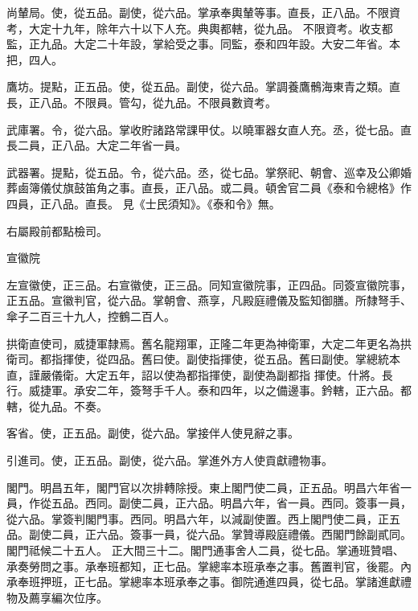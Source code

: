 \begin{pinyinscope}
 尚輦局。使，從五品。副使，從六品。掌承奉輿輦等事。直長，正八品。不限資考，大定十九年，除年六十以下人充。典輿都轄，從九品。
 不限資考。收支都監，正九品。大定二十年設，掌給受之事。同監，泰和四年設。大安二年省。本把，四人。



 鷹坊。提點，正五品。使，從五品。副使，從六品。掌調養鷹鶻海東青之類。直長，正八品。不限員。管勾，從九品。不限員數資考。



 武庫署。令，從六品。掌收貯諸路常課甲仗。以曉軍器女直人充。丞，從七品。直長二員，正八品。大定二年省一員。



 武器署。提點，從五品。令，從六品。丞，從七品。掌祭祀、朝會、巡幸及公卿婚葬鹵簿儀仗旗鼓笛角之事。直長，正八品。或二員。頓舍官二員《泰和令總格》作四員，正八品。直長。
 見《士民須知》。《泰和令》無。



 右屬殿前都點檢司。



 宣徽院



 左宣徽使，正三品。右宣徽使，正三品。同知宣徽院事，正四品。同簽宣徽院事，正五品。宣徽判官，從六品。掌朝會、燕享，凡殿庭禮儀及監知御膳。所隸弩手、傘子二百三十九人，控鶴二百人。



 拱衛直使司，威捷軍隸焉。舊名龍翔軍，正隆二年更為神衛軍，大定二年更名為拱衛司。都指揮使，從四品。舊曰使。副使指揮使，從五品。舊曰副使。掌總統本直，謹嚴儀衛。大定五年，詔以使為都指揮使，副使為副都指
 揮使。什將。長行。威捷軍。承安二年，簽弩手千人。泰和四年，以之備邊事。鈐轄，正六品。都轄，從九品。不奏。



 客省。使，正五品。副使，從六品。掌接伴人使見辭之事。



 引進司。使，正五品。副使，從六品。掌進外方人使貢獻禮物事。



 閣門。明昌五年，閣門官以次排轉除授。東上閣門使二員，正五品。明昌六年省一員，作從五品。西同。副使二員，正六品。明昌六年，省一員。西同。簽事一員，從六品。掌簽判閣門事。西同。明昌六年，以減副使置。西上閣門使二員，正五品。副使二員，正六品。簽事一員，從六品。掌贊導殿庭禮儀。西閣門餘副貳同。閣門祗候二十五人。
 正大間三十二。閣門通事舍人二員，從七品。掌通班贊唱、承奏勞問之事。承奉班都知，正七品。掌總率本班承奉之事。舊置判官，後罷。內承奉班押班，正七品。掌總率本班承奉之事。御院通進四員，從七品。掌諸進獻禮物及薦享編次位序。




\end{pinyinscope}
